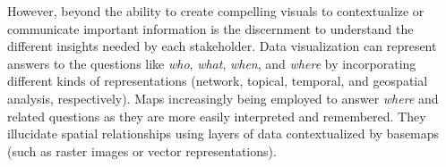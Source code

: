 However, beyond the ability to create compelling visuals to contextualize or communicate important information is the discernment to understand the different insights needed by each stakeholder\cite{Borner2019}. %
Data visualization can represent answers to the questions like \textit{who}, \textit{what}, \textit{when}, and \textit{where} by incorporating different kinds of representations (network, topical, temporal, and geospatial analysis, respectively). %
Maps increasingly being employed to answer \textit{where} and related questions as they are more easily interpreted and remembered\cite{Borner2019}. %
They illucidate spatial relationships using layers of data contextualized by basemaps (such as raster images or vector representations)\cite{Jiang2020,McQueenBaker2019}. %
